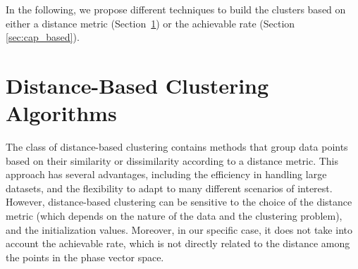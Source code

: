 In the following, we propose different techniques to build the clusters based on either a {distance metric} (Section~\ref{sec:dist_based}) or the {achievable rate} (Section \ref{sec:cap_based}).

\section{Distance-Based Clustering Algorithms}
\label{sec:dist_based}
The class of distance-based clustering contains methods that group data points based on their similarity or dissimilarity according to a distance metric. 
This approach has several advantages, including the efficiency in handling large datasets, and the flexibility to adapt to many different scenarios of interest. 
However, distance-based clustering can be sensitive to the choice of the distance metric (which depends on the nature of the data and the clustering problem), and the initialization values. Moreover, in our specific case, it does not take into account the achievable rate, which is not directly related to the distance among the points in the phase vector space. 

